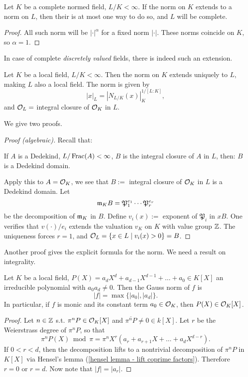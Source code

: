 \begin{corollary}
    Let $K$ be a complete normed field, $L/K < \infty$. If the norm on $K$ extends to a norm on $L$, then their is at most one way to do so, and $L$ will be complete.
\end{corollary}
\begin{proof}
    All such norm will be $|\cdot|^\alpha$ for a fixed norm $|\cdot|$.
    These norms coincide on $K$, so $\alpha = 1$.
\end{proof}

In case of complete \textit{discretely valued} fields, there is indeed such an extension.
\begin{theorem}\label{unique extension of norm for fintie extension local field}
    Let $K$ be a local field, $L/K < \infty$.
    Then the norm on $K$ extends uniquely to $L$, making $L$ also a local field.
    The norm is given by \[|x|_L = \left|N_{L/K}(x)\right|_K^{1/[L : K]},\]
    and $\mathcal{O}_L = $ integral closure of $\mathcal{O}_K$ in $L$. 
\end{theorem}
We give two proofs.
\begin{proof}
    [Proof (algebraic)]Recall that:
\begin{lemma}\label{extension of Dedekind: integral closure of Dedekind domain in finite extension of its fraction field is Dedekind domain}
    If $A$ is a Dedekind, $L/\operatorname{Frac}(A) < \infty$, $B$ is the integral closure of $A$ in $L$, then: $B$ is a Dedekind domain.
\end{lemma}
Apply this to $A = \mathcal{O}_K$,
we see that $B :=$ integral closure of $\mathcal{O}_K$ in $L$ is a Dedekind domain.
Let \[\mathfrak{m}_KB = \mathfrak{P}_1^{e_1}\cdots\mathfrak{P}_r^{e_r}\] be the decomposition of $\mathfrak{m}_K$ in $B$. Define $v_i(x) := $ exponent of $\mathfrak{P}_i$ in $xB$.
One verifies that $v(\cdot)/e_i$ extends the valuation $v_K$ on $K$ with value group $\mathbb{Z}$.
The uniqueness forces $r = 1$, and $\mathcal{O}_L = \{x\in L\mid v_i(x) > 0\} = B$.
\end{proof}
Another proof gives the explicit formula for the norm. We need a result on integrality.
\begin{proposition}\label{monic polynomial integral iff const coeff}
    Let $K$ be a local field, $P(X) = a_dX^d + a_{d-1}X^{d-1} + \dots + a_0\in K[X]$ an irreducible polynomial with $a_0a_d\ne 0$.
    Then the Gauss norm of $f$ is
    \[|f| = \max\{|a_0|, |a_d|\}.\]
    In particular, if $f$ is monic and its constant term $a_0\in\mathcal{O}_K$, then $P(X)\in\mathcal{O}_K[X]$.
\end{proposition}
\begin{proof}
    Let $n\in\mathbb{Z}$ s.t. $\pi^nP\in \mathcal{O}_K[X]$ and $\overline{\pi^nP}\ne 0\in k[X] $.
    Let $r$ be the Weierstrass degree of $\pi^nP$,
    so that \[\pi^nP(X)\bmod\pi = \pi^nX^r(a_r + a_{r+1}X + \dots + a_dX^{d-r}).\] 
    If $0 < r < d$,
    then the decomposition lifts to a nontrivial decomposition of $\pi^nP$ in $K[X]$ via Hensel's lemma (\cref{hensel lemma - lift coprime factors}).
    Therefore $r = 0$ or $r = d$.
    Now note that $|f| = |a_r|$.
\end{proof}
